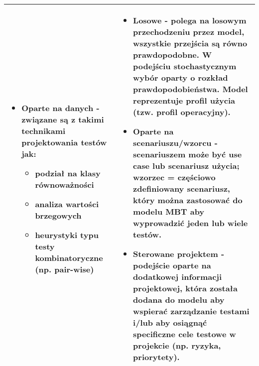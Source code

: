 \documentclass[../main.tex]{subfiles}
\begin{document}
\begin{table}[H]
\begin{center}
\begin{tabular}{| p{8cm} | p{8cm} |}
\begin{itemize}
                    \item \textbf{Oparte na danych} - związane są z takimi technikami projektowania testów jak:
                    \begin{itemize}
                        \item podział na \textbf{klasy równoważności}
                        \item analiza \textbf{wartości} brzegowych
                        \item heurystyki typu testy kombinatoryczne (np. pair-wise)
                    \end{itemize}
                \end{itemize}
                &
                \begin{itemize}
                    \item \textbf{Losowe} - polega na \textbf{losowym przechodzeniu przez model}, wszystkie przejścia są równo
                    prawdopodobne. \textbf{W podejściu stochastycznym} wybór oparty o \textbf{rozkład prawdopodobieństwa}. Model reprezentuje profil
                    użycia (tzw. \textbf{profil operacyjny}).
                    \item \textbf{Oparte na scenariuszu/wzorcu} - scenariuszem może być use case lub
                    scenariusz użycia; wzorzec = częściowo zdefiniowany scenariusz, który można
                    zastosować do modelu MBT aby wyprowadzić jeden lub wiele testów.
                    \item \textbf{Sterowane projektem} - podejście oparte na dodatkowej informacji projektowej, która została
                    dodana do modelu aby wspierać zarządzanie testami i/lub aby osiągnąć specificzne cele testowe w projekcie (np. ryzyka, priorytety).
                \end{itemize} \\
                \hline
            \end{tabular}
        \end{center}
    \end{table}
\end{document}
